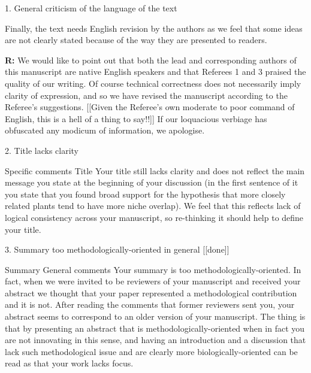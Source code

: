 \documentclass[12pt]{letter}
\newenvironment{refquote}{\bigskip \begin{it}}{\end{it}\smallskip}
\begin{document}
	1. General criticism of the language of the text

		\begin{refquote}

		Finally, the text needs English revision by the authors as we feel that some ideas are not clearly stated because of the way they are presented to readers. 

		\end{refquote}


		\textbf{R:} We would like to point out that both the lead and corresponding authors of this manuscript are native English speakers and that Referees 1 and 3 praised the quality of our writing. Of course technical correctness does not necessarily imply clarity of expression, and so we have revised the manuscript according to the Referee's suggestions. [[Given the Referee's own moderate to poor command of English, this is a hell of a thing to say!!]] If our loquacious verbiage has obfuscated any modicum of information, we apologise.


	2. Title lacks clarity

		\begin{refquote}
		Specific comments
		Title
		Your title still lacks clarity and does not reflect the main message you state at the beginning of your discussion (in the first sentence of it you state that you found broad support for the hypothesis that more closely related plants tend to have more niche overlap). We feel that this reflects lack of logical consistency across your manuscript, so re-thinking it should help to define your title.
		\end{refquote}


	3. Summary too methodologically-oriented in general [[done]]

		\begin{refquote}
			Summary
			General comments
			Your summary is too methodologically-oriented. In fact, when we were invited to be reviewers of your manuscript and received your abstract we thought that your paper represented a methodological contribution and it is not. After reading the comments that former reviewers sent you, your abstract seems to correspond to an older version of your manuscript. The thing is that by presenting an abstract that is methodologically-oriented when in fact you are not innovating in this sense, and having an introduction and a discussion that lack such methodological issue and are clearly more biologically-oriented can be read as that your work lacks focus.
		\end{refquote}
\end{document}

